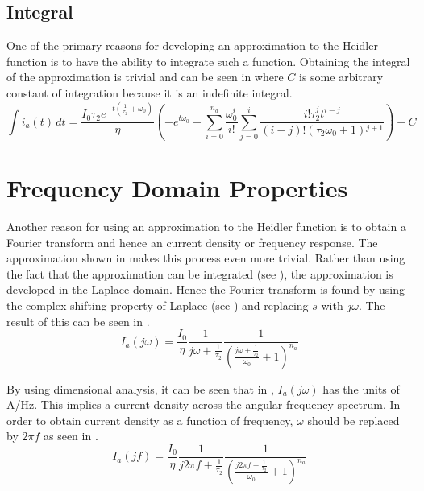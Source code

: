 \subsection{Integral}
One of the primary reasons for developing an approximation to the Heidler function is to have the ability to integrate such a function. Obtaining the integral of the approximation is trivial and can be seen in  where $C$ is some arbitrary constant of integration because it is an indefinite integral.
\label{sub:approx_integral}
\begin{equation}
    \int i_a \left( t \right) \, dt = \frac{I_0 \tau _2 e^{-t \left(\frac{1}{\tau _2}+\omega _0\right)}}{\eta } \left(-e^{t \omega _0} + \sum _{i=0}^{n_a} \frac{\omega _0^i}{i!} \sum _{j=0}^i \frac{i! \tau _2^j t^{i-j}}{(i-j)! \left(\tau _2 \omega _0+1\right){}^{j+1}}\right) + C
    \label{eqn:approxInt}
\end{equation}


\section{Frequency Domain Properties}
\label{sec:approx_frequency_domain_analysis}
Another reason for using an approximation to the Heidler function is to obtain a Fourier transform and hence an current density or frequency response. The approximation shown in  makes this process even more trivial. Rather than using the fact that the approximation can be integrated (see ), the approximation is developed in the Laplace domain. Hence the Fourier transform is found by using the complex shifting property of Laplace (see ) and replacing $s$ with $j\omega$. The result of this can be seen in .
\begin{equation}
    I_a \left( j\omega \right) = \frac{I_0}{\eta}\frac{1}{j\omega + \frac{1}{\tau_2}}\frac{1}{\left ( \frac{j\omega + \frac{1}{\tau_2}}{\omega_0} + 1 \right )^{n_a}}
    \label{eqn:approx_fourier}
\end{equation}

By using dimensional analysis, it can be seen that in , $I_a(j\omega)$ has the units of A/Hz. This implies a current density across the angular frequency spectrum. In order to obtain current density as a function of frequency, $\omega$ should be replaced by $2 \pi f$ as seen in .
\begin{equation}
    I_a \left( jf \right) = \frac{I_0}{\eta}\frac{1}{j2\pi f + \frac{1}{\tau_2}}\frac{1}{\left ( \frac{j2\pi f + \frac{1}{\tau_2}}{\omega_0} + 1 \right )^{n_a}}
    \label{eqn:approx_fourier_freq}
\end{equation}

